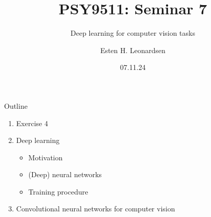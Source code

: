 \documentclass[10pt]{beamer}
\title{PSY9511: Seminar 7}
\subtitle{Deep learning for computer vision tasks}
\author{Esten H. Leonardsen}
\date{07.11.24}
\begin{document}
	\begin{frame}
	 	\maketitle
	\end{frame}

    \begin{frame}{Outline}
        \begin{enumerate}
            \item Exercise 4
            \item Deep learning
            \begin{itemize}
                \item Motivation
                \item (Deep) neural networks
                \item Training procedure
            \end{itemize}
            \item Convolutional neural networks for computer vision
        \end{enumerate}
    \end{frame}

    
    
\end{document}
